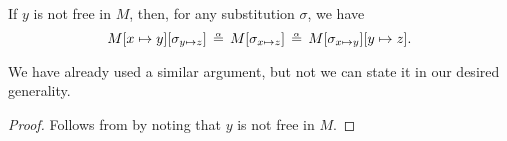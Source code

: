 \begin{corollary}\label{thm:substitution_chain_contraction}
  If \( y \) is not free in \( M \), then, for any substitution \( \sigma \), we have
  \begin{equation}\label{eq:thm:substitution_chain_contraction/contraction}
    M[x \mapsto y][\sigma_{y \mapsto z}]
    \aequiv
    M[\sigma_{x \mapsto z}]
    \aequiv
    M[\sigma_{x \mapsto y}][y \mapsto z].
  \end{equation}
\end{corollary}
\begin{comments}
  \item We have already used a similar argument, but not we can state it in our desired generality.
\end{comments}
\begin{proof}
  Follows from  by noting that \( y \) is not free in \( M \).
\end{proof}

